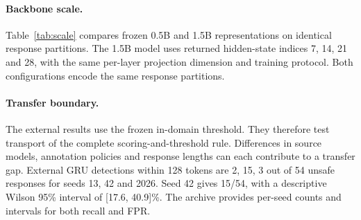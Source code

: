 \paragraph{Backbone scale.}Table~\ref{tab:scale} compares frozen 0.5B and 1.5B representations on identical response partitions. The 1.5B model uses returned hidden-state indices 7, 14, 21 and 28, with the same per-layer projection dimension and training protocol. Both configurations encode the same response partitions.



\paragraph{Transfer boundary.}The external results use the frozen in-domain threshold. They therefore test transport of the complete scoring-and-threshold rule. Differences in source models, annotation policies and response lengths can each contribute to a transfer gap.
External GRU detections within 128 tokens are 2, 15, 3 out of 54 unsafe responses for seeds 13, 42 and 2026. Seed 42 gives 15/54, with a descriptive Wilson 95\% interval of [17.6, 40.9]\%. The archive provides per-seed counts and intervals for both recall and FPR.
